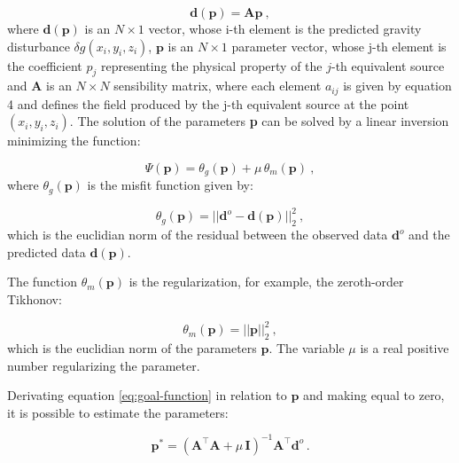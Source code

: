 \documentclass[paper]{geophysics}
\begin{document}
\begin{equation}
\mathbf{d}(\mathbf{p}) = \mathbf{A} \mathbf{p} \: ,
\label{eq:predicted-data-vector}
\end{equation}
where $\mathbf{d}(\mathbf{p})$ is an $N \times 1$ vector, whose i-th element is the predicted gravity disturbance $\delta g(x_{i}, y_{i}, z_{i})$, $\mathbf{p}$ is an $N \times 1$ parameter vector,  whose j-th element is the coefficient $p_{j}$ representing the physical property of the $j$-th equivalent source and $\mathbf{A}$ is  an $N \times N$ sensibility matrix, where each element $a_{ij}$ is given by equation 4 and defines the field produced by  the j-th equivalent source at the point $(x_{i}, y_{i}, z_{i})$.
The solution of the parameters \textbf{p} can be solved by a linear inversion minimizing the function:

\begin{equation}
\Psi(\mathbf{p}) = \theta_g(\mathbf{p}) + \mu \, \theta_m(\mathbf{p}) \: ,
\label{eq:goal-function}
\end{equation}
where $\theta_g(\mathbf{p})$ is the misfit function given by:

\begin{equation}
\theta_g(\mathbf{p}) = ||\mathbf{d}^{o}-\mathbf{d(p)}||_2^2 \: ,
\label{eq:goal-function_d}
\end{equation}
which is the euclidian norm of the residual between the observed data $\mathbf{d}^{o}$ and the predicted data $\mathbf{d(p)}$.

The function $\theta_m(\mathbf{p})$ is the regularization, for example, the zeroth-order Tikhonov:

\begin{equation}
\theta_m(\mathbf{p}) = ||\mathbf{p}||_2^2 \: ,
\label{eq:tikhonov-function}
\end{equation}
which is the euclidian norm of the parameters $\mathbf{p}$. The variable $\mu$ is a real positive number regularizing the parameter.

Derivating equation \ref{eq:goal-function} in relation to $\mathbf{p}$ and making equal to zero, it is possible to estimate the parameters:

\begin{equation}
\mathbf{p}^{\ast} = \left( \mathbf{A}^{\top}\mathbf{A} + 
\mu \, \mathbf{I} \right)^{-1}
\mathbf{A}^{\top} \mathbf{d}^{o} \,.
\label{eq:p-ast-parameter-space}
\end{equation}
\end{document}
